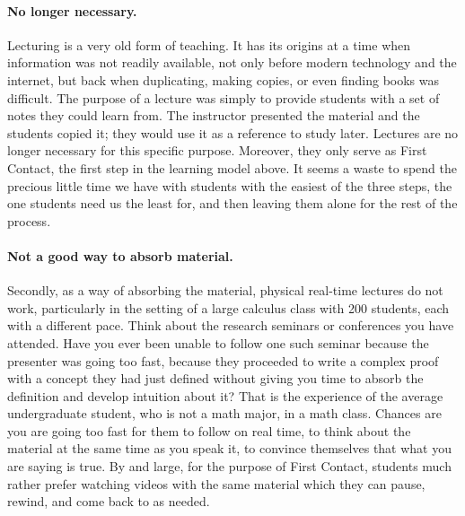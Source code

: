 \documentclass[11pt]{article}
\begin{document}
	\paragraph{No longer necessary.}
	Lecturing is a very old form of teaching. It has its origins at a time when
	information was not readily available, not only before modern technology and the
	internet, but back when duplicating, making copies, or even finding books was
	difficult. The purpose of a lecture was simply to provide students with a set of
	notes they could learn from. The instructor presented the material and the
	students copied it; they would use it as a reference to study later. Lectures
	are no longer necessary for this specific purpose. Moreover, they only serve
	as First Contact, the first step in the learning model above. It seems a waste
	to spend the precious little time we have with students with the easiest of
	the three steps, the one students need us the least for, and then leaving them
	alone for the rest of the process.

	\paragraph{Not a good way to absorb material.}
	Secondly, as a way of absorbing the material, physical real-time lectures do not
	work, particularly in the setting of a large calculus class with 200 students,
	each with a different pace. Think about the research seminars or conferences
	you have attended. Have you ever been unable to follow one such seminar because
	the presenter was going too fast, because they proceeded to write a complex
	proof with a concept they had just defined without giving you time to absorb
	the definition and develop intuition about it? That is the experience of the average
	undergraduate student, who is not a math major, in a math class. Chances are
	you are going too fast for them to follow on real time, to think about the material
	at the same time as you speak it, to convince themselves that what you are
	saying is true. By and large, for the purpose of First Contact, students much rather
	prefer watching videos with the same material which they can pause, rewind, and
	come back to as needed.
\end{document}
